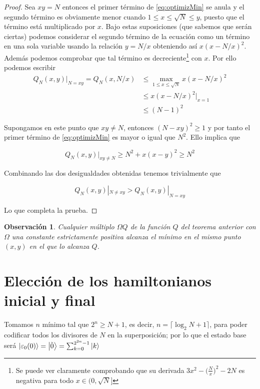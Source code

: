 \documentclass[11pt, spanish]{report}
\numberwithin{equation}{section}
\newtheorem{obs}[defin]{Observación}
\numberwithin{defin}{section}
\begin{document}
\begin{proof}
Sea $xy=N$ entonces el primer término de \ref{eq:optimizMin} se anula y el segundo término es obviamente menor cuando $1\leq x\leq \sqrt{N}\leq y$, puesto que el término está multiplicado por $x$. Bajo estas suposiciones (que sabemos que serán ciertas) podemos considerar el segundo término de la ecuación como un término en una sola variable usando la relación $y=N/x$ obteniendo así $x(x-N/x)^2$. Además podemos comprobar que tal término es decreciente\footnote{Se puede ver claramente comprobando que su derivada $3x^2-\Big(\frac{N}{x}\Big)^2-2N$ es negativa para todo $x\in(0,\sqrt{N}]$} con $x$. Por ello podemos escribir
\begin{equation}
\begin{split}
Q_N(x,y)|_{N=xy}=Q_N(x,N/x)&\leq \max_{1\leq x \leq \sqrt{N}}x(x-N/x)^2\\
&\leq x(x-N/x)^2|_{x=1}\\
&\leq (N-1)^2
\end{split}
\end{equation}

Supongamos en este punto que $xy\neq N$, entonces $(N-xy)^2\geq 1$ y por tanto el primer término de \ref{eq:optimizMin} es mayor o igual que $N^2$. Ello implica que 

\begin{equation}
Q_N(x,y)|_{xy\neq N}\geq N^2+x(x-y)^2\geq N^2
\end{equation}

Combinando las dos desigualdades obtenidas tenemos trivialmente que

\begin{equation}
Q_N(x,y)|_{N\neq xy}>Q_N(x,y)|_{N= xy}
\end{equation}

Lo que completa la prueba.
\end{proof}

\begin{obs}
Cualquier múltiplo $\Omega Q$ de la función $Q$ del teorema anterior con $\Omega$ una constante estrictamente positiva alcanza el mínimo en el mismo punto $(x,y)$ en el que lo alcanza $Q$.
\end{obs}

\section{Elección de los hamiltonianos inicial y final}

Tomamos $n$ mínimo tal que $2^n\geq N+1$, es decir, $n=\lceil \log_2 N + 1 \rceil$, para poder codificar todos los divisores de $N$ en la superposición; por lo que el estado base será $\ket{\varepsilon_0(0)}=\ket{\tilde{0}}=\sum_{k=0}^{2^{2n}-1}\ket{k}$\\
\end{document}

